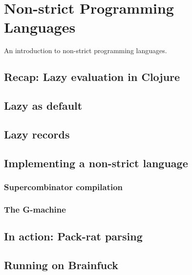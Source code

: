 \chapter{Non-strict Programming Languages}

An introduction to non-strict programming languages.

\section{Recap: Lazy evaluation in Clojure}

\section{Lazy as default}

\section{Lazy records}

\section{Implementing a non-strict language}

\subsection{Supercombinator compilation}

\subsection{The G-machine}

\section{In action: Pack-rat parsing}

\section{Running on Brainfuck}

